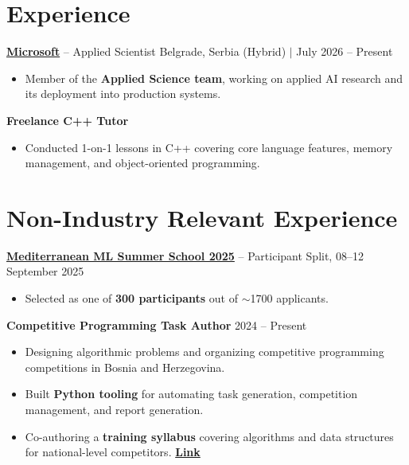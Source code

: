 \documentclass[11pt,letterpaper]{article}
\begin{document}
\vspace{-0.4cm}

\section*{Experience}

\vspace{0.1cm}

\textbf{\href{https://www.microsoft.com/}{Microsoft}} -- Applied Scientist \hfill Belgrade, Serbia (Hybrid) $|$ July 2026 -- Present
\begin{itemize}[noitemsep,topsep=2pt,leftmargin=*]
    \item Member of the \textbf{Applied Science team}, working on applied AI research and its deployment into production systems.
\end{itemize}

\vspace{0.1cm}

\textbf{Freelance C++ Tutor}
\begin{itemize}[noitemsep,topsep=2pt,leftmargin=*]
    \item Conducted 1-on-1 lessons in C++ covering core language features, memory management, and object-oriented programming.
\end{itemize}

\vspace{-0.4cm}

\section*{Non-Industry Relevant Experience}

\textbf{\href{https://www.m2lschool.org/}{Mediterranean ML Summer School 2025}} -- Participant \hfill Split, 08--12 September 2025
\begin{itemize}[noitemsep,topsep=2pt,leftmargin=*]
    \item Selected as one of \textbf{300 participants} out of $\sim$1700 applicants.
\end{itemize}

\vspace{0.1cm}

\textbf{Competitive Programming Task Author} \hfill 2024 -- Present
\begin{itemize}[noitemsep,topsep=2pt,leftmargin=*]
    \item Designing algorithmic problems and organizing competitive programming competitions in Bosnia and Herzegovina.
    \item Built \textbf{Python tooling} for automating task generation, competition management, and report generation.
    \item Co-authoring a \textbf{training syllabus} covering algorithms and data structures for national-level competitors. \hfill \href{https://github.com/LukaNedimovic/silabus}{\textbf{Link}}
\end{itemize}
\end{document}
